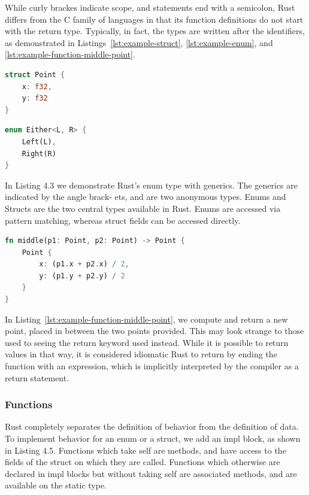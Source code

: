 \documentclass{article}
\begin{document}
While curly brackes indicate scope, and statements end with a semicolon, Rust differs from the C family of languages in that its function definitions do not start with the return type. Typically, in fact, the types are written after the identifiers, as demonstrated in Listings~\ref{lst:example-struct}, \ref{lst:example-enum}, and \ref{lst:example-function-middle-point}.

\begin{lstlisting}[language=Rust, style=boxed, caption=The type definition for a point in two-dimensional space, label=lst:example-struct]
struct Point {
    x: f32,
    y: f32
}
\end{lstlisting}

\begin{lstlisting}[language=Rust, style=boxed, caption=A generic Rust enum, label=lst:example-enum]
enum Either<L, R> {
    Left(L),
    Right(R)
}
\end{lstlisting}

In Listing 4.3 we demonstrate Rust’s enum type with generics. The generics are indicated by the angle brack- ets, and are two anonymous types.
Enums and Structs are the two central types available in Rust. Enums are accessed via pattern matching, whereas struct fields can be accessed directly.

\begin{lstlisting}[language=Rust, style=boxed, caption=A function to compute the point between two points in two-dimensional space, label=lst:example-function-middle-point]
fn middle(p1: Point, p2: Point) -> Point {
    Point {
        x: (p1.x + p2.x) / 2,
        y: (p1.y + p2.y) / 2
    }
}
\end{lstlisting}

In Listing~\ref{lst:example-function-middle-point}, we compute and return a new point, placed in between the two points provided. This may look strange to those used to seeing the return keyword used instead. While it is possible to return values in that way, it is considered idiomatic Rust to return by ending the function with an expression, which is implicitly interpreted by the compiler as a return statement.

\subsubsection{Functions}
Rust completely separates the definition of behavior from the definition of data. To implement behavior for an enum or a struct, we add an impl block, as shown in Listing 4.5. Functions which take self are methods, and have access to the fields of the struct on which they are called. Functions which otherwise are declared in impl blocks but without taking self are associated methods, and are available on the static type.
\end{document}
